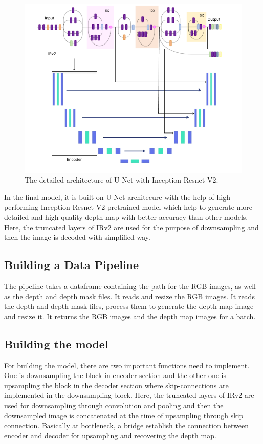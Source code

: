 \documentclass[a4paper,12pt,oneside]{book}
\begin{document}
\vspace{2cm}

\begin{figure}[!hbtp]
\centering
\includegraphics[width=1\textwidth]{Figures/full_model_2.png}
\captionsetup{font=small}
\vspace{2pt}
\caption{The detailed architecture of U-Net with Inception-Resnet V2.}
\label{fig:model}
\end{figure}

\newpage
In the final model, it is built on U-Net architecure with the help of high performing Inception-Resnet V2 pretrained model which help to generate more detailed and high quality depth map with better accuracy than other models. Here, the truncated layers of IRv2 are used for the purpose of downsampling and then the image is decoded with simplified way.


\subsection{Building a Data Pipeline}
The pipeline takes a dataframe containing the path for the RGB images, as well as the depth and depth mask files.
It reads and resize the RGB images.
It reads the depth and depth mask files, process them to generate the depth map image and resize it.
It returns the RGB images and the depth map images for a batch.
\subsection{Building the model}
For building the model, there are two important functions need to implement. One is downsampling the block in encoder section and the other one is upsampling the block in the decoder section where skip-connections are implemented in the downsampling block. Here, the truncated layers of IRv2 are used for downsampling through convolution and pooling and then the downsampled image is concatenated at the time of upsampling through skip connection. Basically at bottleneck, a bridge establish the connection  between encoder and decoder for upsampling and recovering the depth map.
\end{document}
